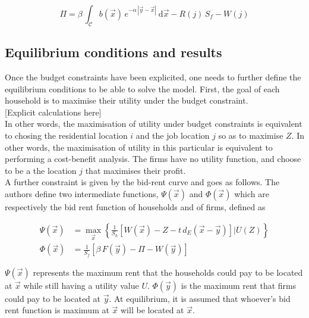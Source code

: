 \begin{equation}
    \Pi = \beta\, \int_{\mathcal{C}} b(\vec{x})\,e^{-\alpha\,\left|\vec{y}-\vec{x}\right|}\:\mathrm{d}\vec{x}
        - R\left(j\right)\,S_f
        - W\left(j\right)
\end{equation}


\subsection{Equilibrium conditions and results}
\label{sub:equilibrium_conditions}

Once the budget constraints have been explicited, one needs to further define
the equilibrium conditions to be able to solve the model. First, the goal of
each household is to maximise their utility under the budget constraint.\\

[Explicit calculations here]\\

In other words, the maximisation of utility under budget constraints is
equivalent to chosing the residential location $i$ and the job location $j$ so
as to maximise $Z$. In other words, the maximisation of utility in this
particular is equivalent to performing a cost-benefit analysis. The firms have
no utility function, and choose to be a the location $j$ that maximises their
profit.\\

A further constraint is given by the bid-rent curve and goes as follows. The authors define two intermediate functions, $\Psi(\vec{x})$ and $\Phi(\vec{x})$ which are
respectively the bid rent function of households and of firms, defined as

\begin{align}
    \Psi\left(\vec{x}\right) &= \max_{\vec{x}} \left\{ \frac{1}{S_h} \left[W(\vec{x} ) - Z -
    t\,d_E\left(\vec{x}-\vec{y}\right)\right] | U(Z)\right\}\\
    \Phi\left(\vec{x}\right) &= \frac{1}{S_f} \left[\beta\,F(\vec{y}) - \Pi -
W(\vec{y})\right]
\end{align}

$\Psi(\vec{x})$ represents the maximum rent that the households could pay to be
located at $\vec{x}$ while still having a utility value $U$. $\Phi(\vec{y})$ is
the maximum rent that firms could pay to be located at $\vec{y}$. At
equilibrium, it is assumed that whoever's bid rent function is maximum at
$\vec{x}$ will be located at $\vec{x}$.\\


